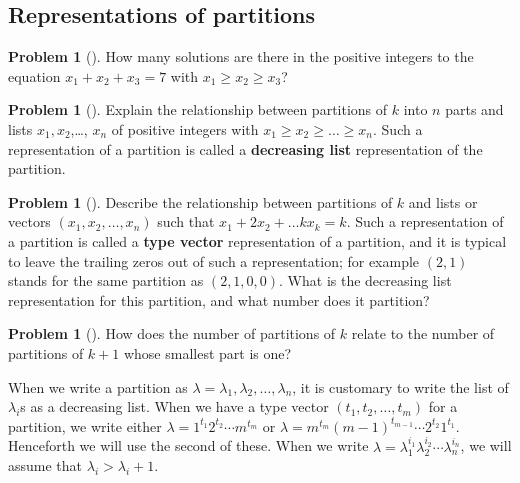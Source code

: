\documentclass[10pt,]{book}
\newcommand{\terminology}[1]{\textbf{#1}}
\theoremstyle{plain}
\theoremstyle{definition}
\newtheorem{activity}[project]{Problem}
\theoremstyle{definition}
\numberwithin{equation}{chapter}
\begin{document}
\subsection[{Representations of partitions}]{Representations of partitions}\label{subsection-37}
\begin{activity}[] \label{activity-159}
How many solutions are there in the positive integers to the equation \(x_1+x_2+x_3 =7\) with \(x_1\ge x_2\ge x_3\)?%
\end{activity}
\begin{activity}[]\marginsymbol[-1em]{} \label{activity-160}
Explain the relationship between partitions of \(k\) into \(n\) parts and lists \(x_1,x_2\),\dots{}, \(x_n\) of positive integers with \(x_1\ge x_2\ge\ldots \ge x_n\). Such a representation of a partition is called a \terminology{decreasing list} representation of the partition.%
\end{activity}
\begin{activity}[] \label{activity-161}
Describe the relationship between partitions of \(k\) and lists or vectors \((x_1,x_2,\ldots,x_n)\) such that \(x_1+2x_2+\ldots kx_k = k\).  Such a representation of a partition is called a \terminology{type vector} representation of a partition, and it is typical to leave the trailing zeros out of such a representation; for example \((2,1)\) stands for the same partition as \((2,1,0,0)\). What is the decreasing list representation for this partition, and what number does it partition?%
\end{activity}
\begin{activity}[]\marginsymbol[-1em]{} \label{activity-162}
How does the number of partitions of \(k\) relate to the number of partitions of \(k+1\) whose smallest part is one?%
\end{activity}
When we write a partition as \(\lambda = \lambda_1,\lambda_2,\ldots,\lambda_n\), it is customary to write the list of \(\lambda_i\)s as a decreasing list. When we have a type vector \((t_1,t_2,\ldots,t_m)\) for a partition, we write either \(\lambda = 1^{t_1}2^{t_2}\cdots m^{t_m}\) or \(\lambda = m^{t_m}(m-1)^{t_{m-1}}\cdots 2^{t_2}1^{t_1}\). Henceforth we will use the second of these. When we write \(\lambda=\lambda_1^{i_1}\lambda_2^{i_2}\cdots\lambda_n^{i_n}\), we will assume that \(\lambda_i>\lambda_i+1\).%
\typeout{************************************************}
\typeout{************************************************}
\end{document}

